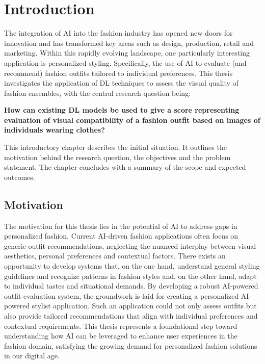 \chapter{Introduction}

The integration of \ac{AI} into the fashion industry has opened new doors for innovation and has transformed key areas such as design, production, retail and marketing. Within this rapidly evolving landscape, one particularly interesting application is personalized styling. Specifically, the use of \acs{AI} to evaluate (and recommend) fashion outfits tailored to individual preferences. This thesis investigates the application of \acs{DL} techniques to assess the visual quality of fashion ensembles, with the central research question being:

\begin{displayquote}
\textbf{How can existing \acs{DL} models be used to give a score representing evaluation of visual compatibility of a fashion outfit based on images of individuals wearing clothes?}
\end{displayquote}

This introductory chapter describes the initial situation. It outlines the motivation behind the research question, the objectives and the problem statement. The chapter concludes with a summary of the scope and expected outcomes.

\section{Motivation}

The motivation for this thesis lies in the potential of \acs{AI} to address gaps in personalized fashion. Current \acs{AI}-driven fashion applications often focus on generic outfit recommendations, neglecting the nuanced interplay between visual aesthetics, personal preferences and contextual factors. There exists an opportunity to develop systems that, on the one hand, understand general styling guidelines and recognize patterns in fashion styles and, on the other hand, adapt to individual tastes and situational demands. By developing a robust \acs{AI}-powered outfit evaluation system, the groundwork is laid for creating a personalized \acs{AI}-powered stylist application. Such an application could not only assess outfits but also provide tailored recommendations that align with individual preferences and contextual requirements. This thesis represents a foundational step toward understanding how \acs{AI} can be leveraged to enhance user experiences in the fashion domain, satisfying the growing demand for personalized fashion solutions in our digital age.

